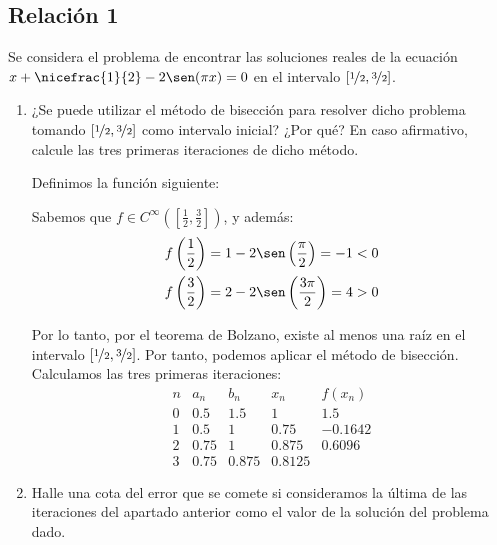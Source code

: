 \subsection{Relación 1}
\setcounter{ejercicio}{0}

\begin{ejercicio}\label{ej:1.1.1}
    Se considera el problema de encontrar las soluciones reales de la ecuación $x + \nicefrac{1}{2} - 2\sen(\pi x) = 0$ en el intervalo $\left[\nicefrac{1}{2},\nicefrac{3}{2}\right]$.
    \begin{enumerate}
        \item ¿Se puede utilizar el método de bisección para resolver dicho problema tomando $\left[\nicefrac{1}{2},\nicefrac{3}{2}\right]$ como intervalo inicial? ¿Por qué? En caso afirmativo, calcule las tres primeras iteraciones de dicho método.
        
        Definimos la función siguiente:

        Sabemos que $f\in C^{\infty}\left(\left[\frac{1}{2},\frac{3}{2}\right]\right)$, y además:
        \begin{align*}
            f\left(\frac{1}{2}\right)&=1-2\sen\left(\frac{\pi}{2}\right)=-1<0\\
            f\left(\frac{3}{2}\right)&=2-2\sen\left(\frac{3\pi}{2}\right)=4>0
        \end{align*}

        Por lo tanto, por el teorema de Bolzano, existe al menos una raíz en el intervalo $\left[\nicefrac{1}{2},\nicefrac{3}{2}\right]$. Por tanto, podemos aplicar el método de bisección.
        Calculamos las tres primeras iteraciones:
        \begin{equation*}
            \begin{array}{c|cccc}
                n & a_n & b_n & x_n & f(x_n)\\
                \hline
                0 & 0.5 & 1.5 & 1 & 1.5\\
                1 & 0.5 & 1 & 0.75 & -0.1642\\
                2 & 0.75 & 1 & 0.875 & 0.6096\\
                3 & 0.75 & 0.875 & 0.8125
            \end{array}
        \end{equation*}
        \item Halle una cota del error que se comete si consideramos la última de las iteraciones del apartado anterior como el valor de la solución del problema dado.


\end{enumerate}
\end{ejercicio}
